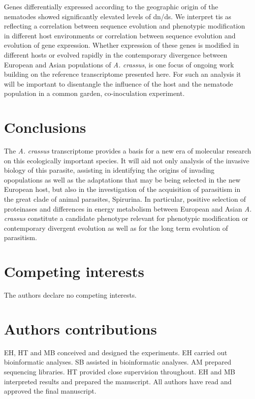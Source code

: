 \documentclass[10pt]{bmc_article}
\newenvironment{bmcformat}{\begin{raggedright}\baselineskip20pt\sloppy\setboolean{publ}{false}}{\end{raggedright}\baselineskip20pt\sloppy}
\begin{document}
\begin{bmcformat}
Genes differentially expressed according to the geographic origin of
the nematodes showed significantly elevated levels of dn/ds. We
interpret tis as reflecting a correlation between sequence evolution
and phenotypic modification in different host environments or
correlation between sequence evolution and evolution of gene
expression. Whether expression of these genes is modified in different
hosts or evolved rapidly in the contemporary divergence between
European and Asian populations of \textit{A. crassus}, is one focus of
ongoing work building on the reference transcriptome presented
here. For such an analysis it will be important to disentangle the
influence of the host and the nematode population in a common garden,
co-inoculation experiment.

\section*{Conclusions }

The \textit{A. crassus} transcriptome provides a basis for a new era
of molecular research on this ecologically important species. It will
aid not only analysis of the invasive biology of this parasite,
assisting in identifying the origins of invading opopulations as well
as the adaptations that may be being selected in the new European
host, but also in the investigation of the acquisition of parasitism
in the great clade of animal parasites, Spirurina. In particular,
positive selection of proteinases and differences in energy metabolism
between European and Asian \textit{A. crassus} constitute a candidate
phenotype relevant for phenotypic modification or contemporary
divergent evolution as well as for the long term evolution of
parasitism.

\section*{Competing interests}
The authors declare no competing interests.

\section*{Authors contributions}

EH, HT and MB conceived and designed the experiments. EH carried out
bioinformatic analyses. SB assisted in bioinformatic analyses. AM
prepared sequencing libraries. HT provided close supervision
throughout. EH and MB interpreted results and prepared the
manuscript. All authors have read and approved the final manuscript.


\end{bmcformat}
\end{document}
